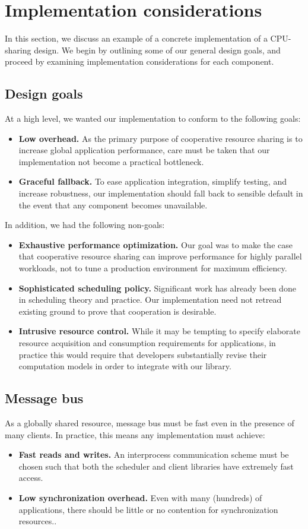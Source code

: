 \section{Implementation considerations}
In this section, we discuss an example of a concrete implementation of a CPU-sharing \mechfull{} design. We begin by outlining some of our general design goals, and proceed by examining implementation considerations for each component.

\subsection{Design goals}
At a high level, we wanted our implementation to conform to the following goals:
\begin{itemize}
    \item \textbf{Low overhead.} As the primary purpose of cooperative resource sharing is to increase global application performance, care must be taken that our \mech{} implementation not become a practical bottleneck.
    \item \textbf{Graceful fallback.} To ease application integration, simplify testing, and increase robustness, our implementation should fall back to sensible default in the event that any component becomes unavailable.
\end{itemize}

In addition, we had the following non-goals:
\begin{itemize}
  \item \textbf{Exhaustive performance optimization.} Our goal was to make the case that cooperative resource sharing can improve performance for highly parallel workloads, not to tune a production environment for maximum efficiency.
  \item \textbf{Sophisticated scheduling policy.} Significant work has already been done in scheduling theory and practice. Our implementation need not retread existing ground to prove that cooperation is desirable.
  \item \textbf{Intrusive resource control.} While it may be tempting to specify elaborate resource acquisition and consumption requirements for applications, in practice this would require that developers substantially revise their computation models in order to integrate with our library.
\end{itemize}

\subsection{Message bus}
As a globally shared resource, message bus must be fast even in the presence of many clients. In practice, this means any implementation must achieve:
\begin{itemize}
    \item \textbf{Fast reads and writes.} An interprocess communication scheme must be chosen such that both the scheduler and client libraries have extremely fast access.
    \item \textbf{Low synchronization overhead.} Even with many (hundreds) of applications, there should be little or no contention for synchronization resources..
\end{itemize}

